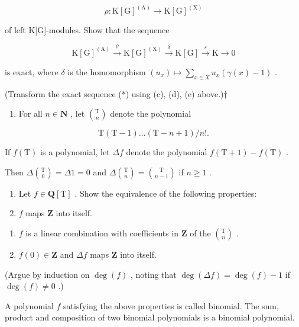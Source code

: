 \[
\rho \colon \mathrm{K} [ \mathrm{G} ] ^ {(\mathrm{A})} \rightarrow \mathrm{K} [ \mathrm{G} ] ^ {(\mathrm{X})}
\]

of left K{[}G{]}-modules. Show that the sequence

\[
\mathrm{K} [ \mathrm{G} ] ^ {(\mathrm{A})} \xrightarrow {\rho} \mathrm{K} [ \mathrm{G} ] ^ {(\mathrm{X})} \xrightarrow {\delta} \mathrm{K} [ \mathrm{G} ] \xrightarrow {\varepsilon} \mathrm{K} \longrightarrow 0\tag{**}
\]

is exact, where \(\delta\) is the homomorphism \((u_x) \mapsto \sum_{x \in X} u_x(\gamma(x) - 1)\) .

(Transform the exact sequence (*) using (c), (d), (e) above.)†

\begin{enumerate}
\def\labelenumi{\arabic{enumi}.}
\setcounter{enumi}{3}
\tightlist
\item
  For all \(n \in \mathbf{N}\) , let \(\binom{\mathrm{T}}{n}\) denote the polynomial
\end{enumerate}

\[
\mathrm{T} (\mathrm{T} - 1) \dots (\mathrm{T} - n + 1) / n!.
\]

If \(f(\mathrm{T})\) is a polynomial, let \(\Delta f\) denote the polynomial \(f(\mathrm{T} + 1) - f(\mathrm{T})\) .

Then \(\Delta\binom{\mathrm{T}}{0} = \Delta 1 = 0\) and \(\Delta\binom{\mathrm{T}}{n} = \binom{\mathrm{T}}{n - 1}\) if \(n \geqslant 1\) .

\begin{enumerate}
\def\labelenumi{(\alph{enumi})}
\item
  Let \(f \in \mathbf{Q}[\mathrm{T}]\) . Show the equivalence of the following properties:
\item
  \(f\) maps \(\mathbf{Z}\) into itself.
\end{enumerate}

\begin{enumerate}
\def\labelenumi{(\roman{enumi})}
\setcounter{enumi}{1}
\item
  \(f\) is a linear combination with coefficients in \(\mathbf{Z}\) of the \(\binom{\mathrm{T}}{n}\) .
\item
  \(f(0)\in \mathbf{Z}\) and \(\Delta f\) maps \(\mathbf{Z}\) into itself.
\end{enumerate}

(Argue by induction on \(\deg(f)\) , noting that \(\deg(\Delta f) = \deg(f) - 1\) if \(\deg(f) \neq 0\) .)

A polynomial \(f\) satisfying the above properties is called binomial. The sum, product and composition of two binomial polynomials is a binomial polynomial.

